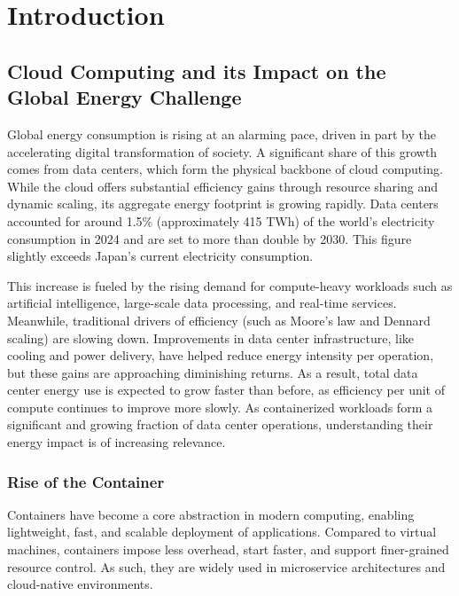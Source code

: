 \chapter{Introduction} %
\label{Chapter1}

\section{Cloud Computing and its Impact on the Global Energy Challenge}

Global energy consumption is rising at an alarming pace, driven in part by the accelerating digital transformation of society. A significant share of this growth comes from data centers, which form the physical backbone of cloud computing. While the cloud offers substantial efficiency gains through resource sharing and dynamic scaling, its aggregate energy footprint is growing rapidly. Data centers accounted for around 1.5\% (approximately 415 TWh) of the world's electricity consumption in 2024 and are set to more than double by 2030\parencite{iea2025energyai}. This figure slightly exceeds Japan's current electricity consumption.

This increase is fueled by the rising demand for compute-heavy workloads such as artificial intelligence, large-scale data processing, and real-time services. Meanwhile, traditional drivers of efficiency (such as Moore’s law and Dennard scaling) are slowing down\parencite{tomshardware2023mooreslaw, cartesian2013dennard}. Improvements in data center infrastructure, like cooling and power delivery, have helped reduce energy intensity per operation\parencite{uptime2023pue}, but these gains are approaching diminishing returns. As a result, total data center energy use is expected to grow faster than before, as efficiency per unit of compute continues to improve more slowly\parencite{masanet2020}. As containerized workloads form a significant and growing fraction of data center operations, understanding their energy impact is of increasing relevance.

\subsection{Rise of the Container}

Containers have become a core abstraction in modern computing, enabling lightweight, fast, and scalable deployment of applications. Compared to virtual machines, containers impose less overhead, start faster, and support finer-grained resource control. As such, they are widely used in microservice architectures and cloud-native environments\parencite{Potdar2020}.

